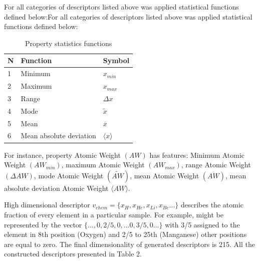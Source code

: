 For all categories of descriptors listed above was applied statistical functions defined below:For all categories of descriptors listed above was applied statistical functions defined below:

\begin{table}[H]

\centering
\caption{Property statistics functions}
\begin{tabular}{|p{1cm}|p{5cm}|p{5cm}|}
\hline 
N & Function & Symbol \\ 
\hline 
1 & Minimum & $x_{min}$ \\ 
2 & Maximum & $x_{max}$  \\ 
3 & Range & $\Delta x$  \\ 
4 & Mode & $\tilde{x}$ \\ 
5 & Mean & $\overline{x}$ \\ 
6 & Mean absolute deviation & $\langle x \rangle$ \\ 
\hline 
\end{tabular} 
\end{table}

For instance, property Atomic Weight $(AW)$ has features:
Minimum Atomic Weight $(AW_{min})$, maximum Atomic Weight $(AW_{max})$, range Atomic Weight $(\Delta AW)$, mode Atomic Weight $(\widetilde{AW})$, mean Atomic Weight $(\overline{AW})$, mean absolute deviation Atomic Weight $\langle AW \rangle$.

High dimensional descriptor $v_{chem} = \{ x_H, x_{He},x_{Li},x_{Be} ... \}$ describes the atomic fraction of every element in a particular sample.
For example,   might be represented by the vector $\{ …, 0, 2/5, 0, … 0, 3/5, 0… \}$ with 3/5 assigned to the element in 8th position (Oxygen) and 2/5 to 25th (Manganese) other positions are equal to zero. The final dimensionality of generated descriptors is 215.
All the constructed descriptors presented in Table 2.

